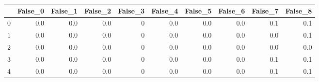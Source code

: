 \begin{tabular}{lrrrrrrrrr}
\toprule
{} &  False\_0 &  False\_1 &  False\_2 &  False\_3 &  False\_4 &  False\_5 &  False\_6 &  False\_7 &  False\_8 \\ \hline
\midrule
0 &      0.0 &      0.0 &      0.0 &        0 &      0.0 &      0.0 &      0.0 &      0.1 &      0.1 \\ \hline
1 &      0.0 &      0.0 &      0.0 &        0 &      0.0 &      0.0 &      0.0 &      0.0 &      0.1 \\ \hline
2 &      0.0 &      0.0 &      0.0 &        0 &      0.0 &      0.0 &      0.0 &      0.0 &      0.0 \\ \hline
3 &      0.0 &      0.0 &      0.0 &        0 &      0.0 &      0.0 &      0.0 &      0.1 &      0.1 \\ \hline
4 &      0.0 &      0.0 &      0.0 &        0 &      0.0 &      0.0 &      0.0 &      0.1 &      0.1 \\ \hline
\bottomrule
\end{tabular}

